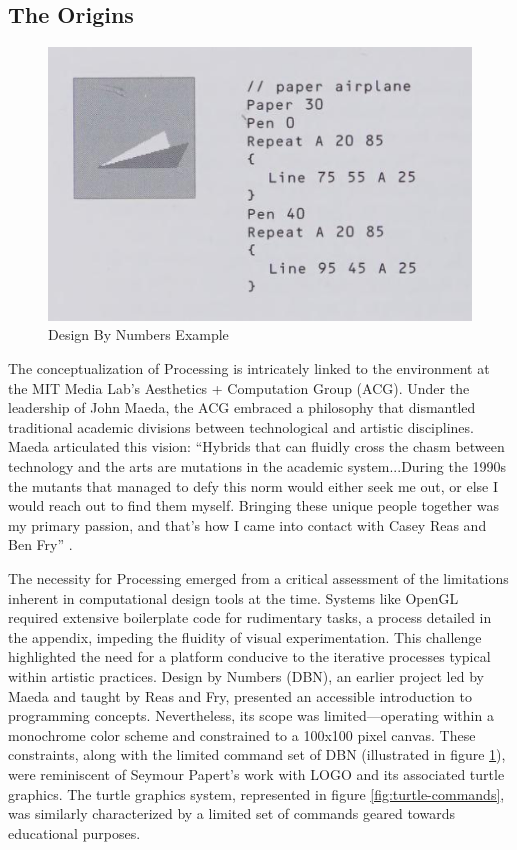 
\subsection{The Origins}
\begin{figure}
    \includegraphics[max width=\textwidth]{images/dbn.png} 
    \caption{Design By Numbers Example \parencite[66]{maedaDesignNumbers2001}}
    \label{fig:dbn}
  \end{figure}

The conceptualization of Processing is intricately linked to the environment at the MIT Media Lab's Aesthetics + Computation Group (ACG). Under the leadership of John Maeda, the ACG embraced a philosophy that dismantled traditional academic divisions between technological and artistic disciplines. Maeda articulated this vision: \enquote{Hybrids that can fluidly cross the chasm between technology and the arts are mutations in the academic system...During the 1990s the mutants that managed to defy this norm would either seek me out, or else I would reach out to find them myself. Bringing these unique people together was my primary passion, and that’s how I came into contact with Casey Reas and Ben Fry} \parencite{reasProcessingProgrammingHandbook2007a}.

The necessity for Processing emerged from a critical assessment of the limitations inherent in computational design tools at the time. Systems like OpenGL required extensive boilerplate code for rudimentary tasks, a process detailed in the appendix, impeding the fluidity of visual experimentation. This challenge highlighted the need for a platform conducive to the iterative processes typical within artistic practices.
Design by Numbers (DBN)\parencite{maedaDesignNumbers2001}, an earlier project led by Maeda and taught by Reas and Fry, presented an accessible introduction to programming concepts. Nevertheless, its scope was limited—operating within a monochrome color scheme and constrained to a 100x100 pixel canvas. These constraints, along with the limited command set of DBN (illustrated in figure \ref{fig:dbn}), were reminiscent of Seymour Papert's work with LOGO and its associated turtle graphics. The turtle graphics system, represented in figure \ref{fig:turtle-commands}, was similarly characterized by a limited set of commands geared towards educational purposes.

